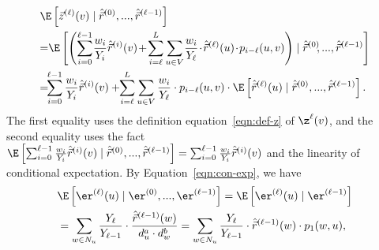 \begin{equation}\label{eqn:var-total-1}
\begin{aligned}
&\E \left[\vec{z}^{(\ell)}(v) \mid \hat{\vec{r}}^{(0)},...,\hat{\vec{r}}^{(\ell-1)}\right]\\
&\hspace{-1mm}=\hspace{-1mm}\E \left[\left( \sum_{i=0}^{\ell-1} \hspace{-0.5mm}\frac{w_i}{Y_i}\hat{\vec{r}}^{(i)}(v)\hspace{-0.5mm}+\hspace{-0.5mm} \sum_{i=\ell}^{L}\sum_{u \in V}\hspace{-0.5mm} \frac{w_i}{Y_{\ell}}\hspace{-0.5mm} \cdot \hspace{-0.5mm} \hat{\vec{r}}^{(\ell)}(u)\hspace{-0.5mm}\cdot \hspace{-0.5mm} p_{i-\ell}(u,v)\right) \mid \hat{\vec{r}}^{(0)}\hspace{-1mm},...,\hat{\vec{r}}^{(\ell-1)}\right]\\
&\hspace{-1mm}=\hspace{-1.5mm}\sum_{i=0}^{\ell-1} \frac{w_i}{Y_i}\hat{\vec{r}}^{(i)}(v)+ \hspace{-1mm}\sum_{i=\ell}^{L}\sum_{u \in V} \frac{w_i}{Y_{\ell}} \cdot p_{i-\ell}(u,v) \cdot \E \left[\hat{\vec{r}}^{(\ell)}(u) \mid \hat{\vec{r}}^{(0)},...,\hat{\vec{r}}^{(\ell-1)}\right]. 
\end{aligned}
\end{equation}
The first equality uses the definition equation~\eqref{eqn:def-z} of $\z^{\ell}(v)$, and the second equality uses the fact $\E \left[\sum_{i=0}^{\ell-1} \frac{w_i}{Y_i}\hat{\vec{r}}^{(i)}(v) \mid \hat{\vec{r}}^{(0)},...,\hat{\vec{r}}^{(\ell-1)}\right]= \sum_{i=0}^{\ell-1} \frac{w_i}{Y_i}\hat{\vec{r}}^{(i)}(v)$ and the linearity of conditional expectation. By Equation~\eqref{eqn:con-exp}, we have 
\begin{equation}\nonumber
\begin{aligned}
&\E \left[\er^{(\ell)}(u) \mid \er^{(0)},...,\er^{(\ell-1)}\right]=\E \left[\er^{(\ell)}(u) \mid \er^{(\ell-1)}\right]\\
&=\sum_{w \in N_u} \frac{Y_{\ell}}{Y_{\ell-1}} \cdot \frac{\hat{\vec{r}}^{(\ell-1)}(w)}{d_u^a\cdot d_w^b}
=\sum_{w \in N_u}\frac{Y_{\ell}}{Y_{\ell-1}} \cdot \hat{\vec{r}}^{(\ell-1)}(w)\cdot p_1(w,u),      
\end{aligned}
\end{equation}
